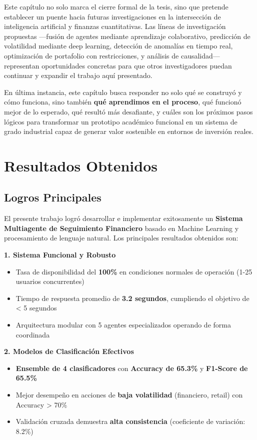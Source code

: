 \documentclass[12pt,a4paper]{report}
\begin{document}
Este capítulo no solo marca el cierre formal de la tesis, sino que pretende establecer un puente hacia futuras investigaciones en la intersección de inteligencia artificial y finanzas cuantitativas. Las líneas de investigación propuestas —fusión de agentes mediante aprendizaje colaborativo, predicción de volatilidad mediante deep learning, detección de anomalías en tiempo real, optimización de portafolio con restricciones, y análisis de causalidad— representan oportunidades concretas para que otros investigadores puedan continuar y expandir el trabajo aquí presentado.

En última instancia, este capítulo busca responder no solo qué se construyó y cómo funciona, sino también \textbf{qué aprendimos en el proceso}, qué funcionó mejor de lo esperado, qué resultó más desafiante, y cuáles son los próximos pasos lógicos para transformar un prototipo académico funcional en un sistema de grado industrial capaz de generar valor sostenible en entornos de inversión reales.

\section{Resultados Obtenidos}

\subsection{Logros Principales}

El presente trabajo logró desarrollar e implementar exitosamente un \textbf{Sistema Multiagente de Seguimiento Financiero} basado en Machine Learning y procesamiento de lenguaje natural. Los principales resultados obtenidos son:

\textbf{1. Sistema Funcional y Robusto}
\begin{itemize}
    \item Tasa de disponibilidad del \textbf{100\%} en condiciones normales de operación (1-25 usuarios concurrentes)
    \item Tiempo de respuesta promedio de \textbf{3.2 segundos}, cumpliendo el objetivo de < 5 segundos
    \item Arquitectura modular con 5 agentes especializados operando de forma coordinada
\end{itemize}

\textbf{2. Modelos de Clasificación Efectivos}
\begin{itemize}
    \item \textbf{Ensemble de 4 clasificadores} con \textbf{Accuracy de 65.3\%} y \textbf{F1-Score de 65.5\%}
    \item Mejor desempeño en acciones de \textbf{baja volatilidad} (financiero, retail) con Accuracy > 70\%
    \item Validación cruzada demuestra \textbf{alta consistencia} (coeficiente de variación: 8.2\%)
\end{itemize}
\end{document}
